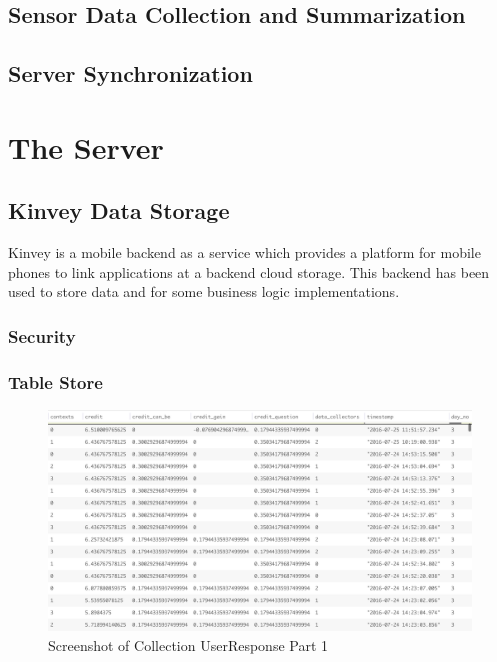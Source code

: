 \subsection{Sensor Data Collection and Summarization}

\subsection{Server Synchronization}


\section{The Server}

\subsection{Kinvey Data Storage}

Kinvey is a mobile backend as a service which provides a platform for mobile phones to link applications at a backend cloud storage. This backend has been used to store data and for some business logic implementations.
\subsubsection{Security}

\subsubsection{Table Store}

\begin{figure}[ht!]
\centering
\includegraphics[width=\textwidth,keepaspectratio, height=0.6\textwidth]{./images/collection_ur_1}
\caption{Screenshot of Collection UserResponse Part 1}
\label{fig:col_ur_1}
\end{figure}

